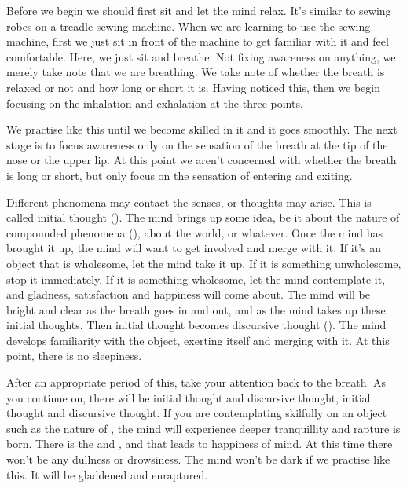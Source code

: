 Before we begin we should first sit and let the mind relax. It's similar to sewing robes on a treadle sewing machine. When we are learning to use the sewing machine, first we just sit in front of the machine to get familiar with it and feel comfortable. Here, we just sit and breathe. Not fixing awareness on anything, we merely take note that we are breathing. We take note of whether the breath is relaxed or not and how long or short it is. Having noticed this, then we begin focusing on the inhalation and exhalation at the three points.

We practise like this until we become skilled in it and it goes smoothly. The next stage is to focus awareness only on the sensation of the breath at the tip of the nose or the upper lip. At this point we aren't concerned with whether the breath is long or short, but only focus on the sensation of entering and exiting.

Different phenomena may contact the senses, or thoughts may arise. This is called initial thought (). The mind brings up some idea, be it about the nature of compounded phenomena (), about the world, or whatever. Once the mind has  brought it up, the mind will want to get involved and merge with it. If it's an object that is wholesome, let the mind take it up. If it is something unwholesome, stop it immediately. If it is something wholesome, let the mind contemplate it, and gladness, satisfaction and happiness will come about. The mind will be bright and clear as the breath goes in and out, and as the mind takes up these initial thoughts. Then initial thought becomes discursive thought (). The mind develops familiarity with the object, exerting itself and merging with it. At this point, there is no sleepiness.

After an appropriate period of this, take your attention back to the breath. As you continue on, there will be initial thought and discursive thought, initial thought and discursive thought. If you are contemplating skilfully on an object such as the nature of , the mind will experience deeper tranquillity and rapture is born. There is the  and , and that leads to happiness of mind. At this time there won't be any dullness or drowsiness. The mind won't be dark if we practise like this. It will be gladdened and enraptured.

